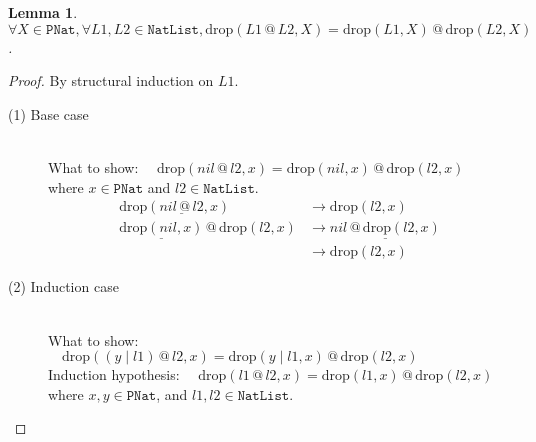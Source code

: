 \documentclass[12pt, a4paper]{article}
\newtheorem{lemma}[theorem]{Lemma}
\newcommand{\rel}[1]{\mathrel{#1}}
\newcommand{\rmx}[1]{\mathrm{#1}}
\newcommand{\larrow}{\longrightarrow}
\newcommand{\under}{\underline}
\begin{document}
\begin{lemma}
\label{lm1}
$\forall X \in \mathtt{PNat}, \forall L1, L2 \in \mathtt{NatList}, \rmx{drop}(L1 \rel{@} L2, X) = \rmx{drop}(L1, X) \rel{@} \rmx{drop}(L2, X)$.
\end{lemma}
\begin{proof}
By structural induction on $L1$.

\begin{description}

\item[(1) Base case]~\\
\noindent
What to show: $\quad \rmx{drop}(nil \rel{@} l2, x) = \rmx{drop}(nil, x) \rel{@} \rmx{drop}(l2, x)$ \\
where $x \in \mathtt{PNat}$ and $l2 \in \mathtt{NatList}$.
\begin{align*}
\rmx{drop}(\under{nil \rel{@} l2}, x)
	&\larrow \rmx{drop}(l2, x) \tag{by @1} \\
\under{\rmx{drop}(nil, x)} \rel{@} \rmx{drop}(l2, x)
	&\larrow \under{nil \rel{@} \rmx{drop}(l2, x)} \tag{by drop1} \\
	&\larrow \rmx{drop}(l2, x) \tag{by @1} 
\end{align*}

\item[(2) Induction case]~\\
What to show: $\quad \rmx{drop}((y \rel{|} l1) \rel{@} l2, x) = \rmx{drop}(y \rel{|} l1, x) \rel{@} \rmx{drop}(l2, x)$ \\
Induction hypothesis: $\quad \rmx{drop}(l1 \rel{@} l2, x) = \rmx{drop}(l1, x) \rel{@} \rmx{drop}(l2, x)$ \\
where $x, y \in \mathtt{PNat}$, and $l1, l2 \in \mathtt{NatList}$.


\end{description}
\end{proof}
\end{document}
